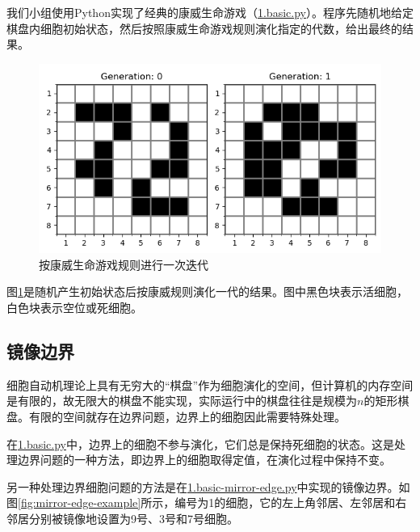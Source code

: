 \documentclass{ctexart}
\begin{document}
我们小组使用Python实现了经典的康威生命游戏（\underline{1.basic.py}）。程序先随机地给定棋盘内细胞初始状态，然后按照康威生命游戏规则演化指定的代数，给出最终的结果。

\begin{figure}[h]
  \centering
  \includegraphics[scale=0.75]{cellular-automation.png}
  \caption{按康威生命游戏规则进行一次迭代}
  \label{fig:cellular-automation}
\end{figure}

图\ref{fig:cellular-automation}是随机产生初始状态后按康威规则演化一代的结果。图中黑色块表示活细胞，白色块表示空位或死细胞。

\subsection{镜像边界}

细胞自动机理论上具有无穷大的“棋盘”作为细胞演化的空间，但计算机的内存空间是有限的，故无限大的棋盘不能实现，实际运行中的棋盘往往是规模为$n$的矩形棋盘。有限的空间就存在边界问题，边界上的细胞因此需要特殊处理。

在\underline{1.basic.py}中，边界上的细胞不参与演化，它们总是保持死细胞的状态。这是处理边界问题的一种方法，即边界上的细胞取得定值，在演化过程中保持不变。

另一种处理边界细胞问题的方法是在\underline{1.basic-mirror-edge.py}中实现的镜像边界。如图\ref{fig:mirror-edge-example}所示，编号为1的细胞，它的左上角邻居、左邻居和右邻居分别被镜像地设置为9号、3号和7号细胞。
\end{document}
